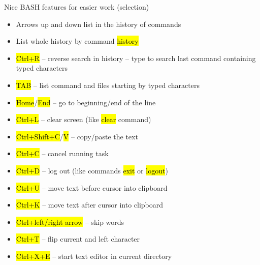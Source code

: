 \documentclass[compress, ucs, xelatex, 11pt, xcolor=svgnames,
  hyperref={
    bookmarks=true,
    unicode=true,
    colorlinks=true,
    pdftitle={Linux, command line and MetaCentrum},
    plainpages=false,
    pdfauthor={Vojtech Zeisek},
    pdfsubject={Course about use of Linux command line, writing shell scripts and using MetaCentrum of CESNET},
    pdfcreator={XeLaTeX},
    pdfkeywords={Linux, GNU, BASH, shell, command line, MetaCentrum},
    linkcolor=Red,
    anchorcolor=Blue,
    citecolor=Purple,
    filecolor=DodgerBlue,
    menucolor=DarkOrchid,
    urlcolor=DeepSkyBlue,
    pdftex},
  url={hyphens, lowtilde} %
  ]{beamer}
\renewcommand{\texttt}[1]{\hl{\ttfamily #1}}
\begin{document}
\begin{frame}{Nice BASH features for easier work (selection)}
\begin{itemize}
  \item Arrows up and down list in the history of commands
  \item List whole history by command \texttt{history}
  \item \texttt{Ctrl+R} -- reverse search in history -- type to search last command containing typed characters
  \item \texttt{TAB} -- list command and files starting by typed characters
  \item \texttt{Home}/\texttt{End} -- go to beginning/end of the line
  \item \texttt{Ctrl+L} -- clear screen (like \texttt{clear} command)
  \item \texttt{Ctrl+Shift+C}/\texttt{V} -- copy/paste the text
  \item \texttt{Ctrl+C} -- cancel running task
  \item \texttt{Ctrl+D} -- log out (like commands \texttt{exit} or \texttt{logout})
  \item \texttt{Ctrl+U} -- move text before cursor into clipboard
  \item \texttt{Ctrl+K} -- move text after cursor into clipboard
  \item \texttt{Ctrl+left/right arrow} -- skip words
  \item \texttt{Ctrl+T} -- flip current and left character
  \item \texttt{Ctrl+X+E} -- start text editor in current directory
\end{itemize}
\end{frame}
\end{document}
